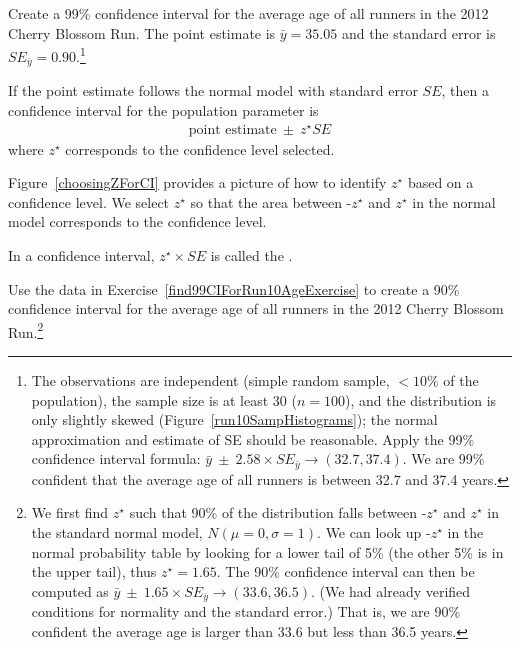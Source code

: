\begin{exercise} \label{find99CIForRun10AgeExercise}
Create a 99\% confidence interval for the average age of all runners in the 2012 Cherry Blossom Run. The point estimate is $\bar{y} = 35.05$ and the standard error is $SE_{\bar{y}} = 0.90$.\footnote{The observations are independent (simple random sample, $<10\%$ of the population), the sample size is at least 30 ($n=100$), and the distribution is only slightly skewed (Figure~\ref{run10SampHistograms}); the normal approximation and estimate of SE should be reasonable. Apply the 99\% confidence interval formula: $\bar{y}\ \pm\ 2.58 \times  SE_{\bar{y}} \rightarrow (32.7, 37.4)$. We are 99\% confident that the average age of all runners is between 32.7 and 37.4 years.}
\end{exercise}

\begin{termBox}{
If the point estimate follows the normal model with standard error $SE$, then a confidence interval for the population parameter is
\begin{eqnarray*}
\text{point estimate}\ \pm\ z^{\star} SE
\end{eqnarray*}
where $z^{\star}$ corresponds to the confidence level selected.}
\end{termBox}

Figure~\ref{choosingZForCI} provides a picture of how to identify $z^{\star}$ based on a confidence level. We select $z^{\star}$ so that the area between -$z^{\star}$ and $z^{\star}$ in the normal model corresponds to the confidence level. 

\begin{termBox}{
\label{marginOfErrorTermBox}In a confidence interval, $z^{\star}\times SE$ is called the .}
\end{termBox}

\begin{exercise} \label{find90CIForRun10AgeExercise}
Use the data in Exercise~\ref{find99CIForRun10AgeExercise} to create a 90\% confidence interval for the average age of all runners in the 2012 Cherry Blossom Run.\footnote{We first find $z^{\star}$ such that 90\% of the distribution falls between -$z^{\star}$ and $z^{\star}$ in the standard normal model, $N(\mu=0, \sigma=1)$. We can look up -$z^{\star}$ in the normal probability table by looking for a lower tail of 5\% (the other 5\% is in the upper tail), thus $z^{\star}=1.65$. The 90\% confidence interval can then be computed as $\bar{y}\ \pm\ 1.65\times SE_{\bar{y}} \to (33.6, 36.5)$. (We had already verified conditions for normality and the standard error.) That is, we are 90\% confident the average age is larger than 33.6 but less than 36.5 years.}
\end{exercise}

